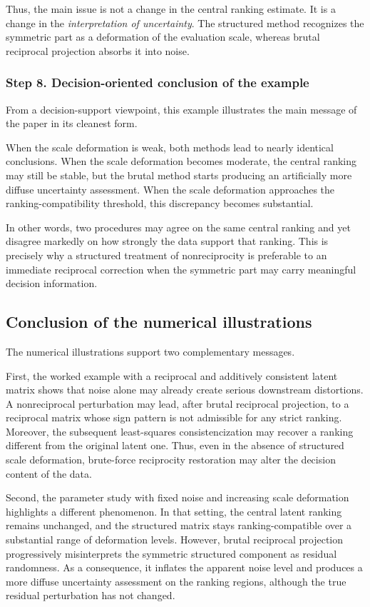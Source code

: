 \documentclass[11pt]{amsart}
\theoremstyle{definition}
\theoremstyle{plain}
\numberwithin{equation}{section}
\begin{document}
Thus, the main issue is not a change in the central ranking estimate. It is a change in the \emph{interpretation of uncertainty}. The structured method recognizes the symmetric part as a deformation of the evaluation scale, whereas brutal reciprocal projection absorbs it into noise.

\subsubsection*{Step 8. Decision-oriented conclusion of the example}

From a decision-support viewpoint, this example illustrates the main message of the paper in its cleanest form.

When the scale deformation is weak, both methods lead to nearly identical conclusions. When the scale deformation becomes moderate, the central ranking may still be stable, but the brutal method starts producing an artificially more diffuse uncertainty assessment. When the scale deformation approaches the ranking-compatibility threshold, this discrepancy becomes substantial.

In other words, two procedures may agree on the same central ranking and yet disagree markedly on how strongly the data support that ranking. This is precisely why a structured treatment of nonreciprocity is preferable to an immediate reciprocal correction when the symmetric part may carry meaningful decision information.
\subsection{Conclusion of the numerical illustrations}

The numerical illustrations support two complementary messages.

First, the worked example with a reciprocal and additively consistent latent matrix shows that noise alone may already create serious downstream distortions. A nonreciprocal perturbation may lead, after brutal reciprocal projection, to a reciprocal matrix whose sign pattern is not admissible for any strict ranking. Moreover, the subsequent least-squares consistencization may recover a ranking different from the original latent one. Thus, even in the absence of structured scale deformation, brute-force reciprocity restoration may alter the decision content of the data.

Second, the parameter study with fixed noise and increasing scale deformation highlights a different phenomenon. In that setting, the central latent ranking remains unchanged, and the structured matrix stays ranking-compatible over a substantial range of deformation levels. However, brutal reciprocal projection progressively misinterprets the symmetric structured component as residual randomness. As a consequence, it inflates the apparent noise level and produces a more diffuse uncertainty assessment on the ranking regions, although the true residual perturbation has not changed.
\end{document}
